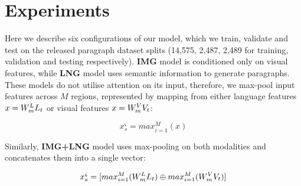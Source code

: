 \documentclass[11pt,a4paper]{article}
\begin{document}

\section{Experiments}



Here we describe six configurations of our model, which we train, validate and test on the released paragraph dataset splits (14,575, 2,487, 2,489 for training, validation and testing respectively).
\textbf{IMG} model is conditioned only on visual features, while \textbf{LNG} model uses semantic information to generate paragraphs.
These models do not utilise attention on its input, therefore, we max-pool input features across $M$ regions, represented by mapping from either language features $x=W_{m}\sp{L} L_t$ or visual features $x=W_{m}\sp{V} V_t$:

\begin{equation}
    x^\varsigma_s =  max_{i=1}^M(x)
    \label{eqn:maxpool}
\end{equation}

Similarly, \textbf{IMG+LNG} model uses max-pooling on both modalities and concatenates them into a single vector:

\begin{equation}
    x^\varsigma_s = [max_{i=1}^M(W_{m}\sp{L} L_t) \oplus max_{i=1}^M(W_{m}\sp{V} V_t)]
    \label{eqn:maxpool}
\end{equation}
\end{document}
